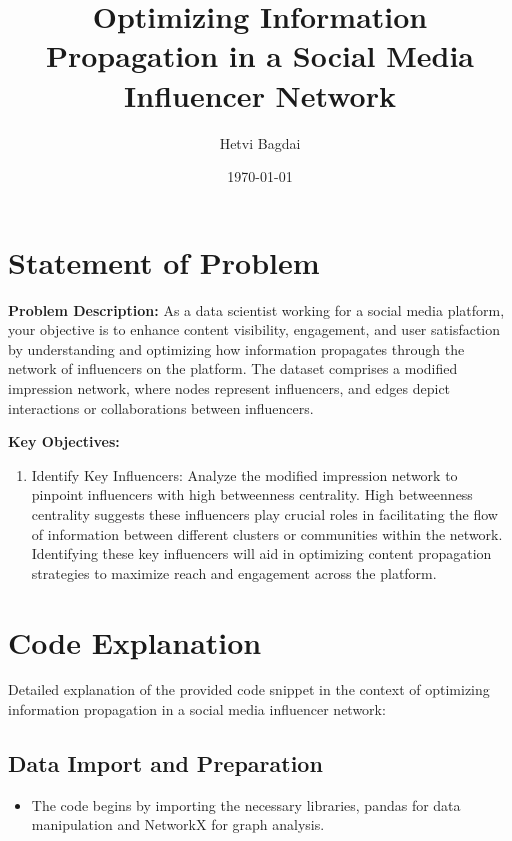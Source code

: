 \documentclass{article}
\title{Optimizing Information Propagation in a Social Media Influencer Network}
\author{Hetvi Bagdai}
\date{\today}
\begin{document}
\maketitle

\section{Statement of Problem}
\textbf{Problem Description:} As a data scientist working for a social media platform, your objective is to enhance content visibility, engagement, and user satisfaction by understanding and optimizing how information propagates through the network of influencers on the platform. The dataset comprises a modified impression network, where nodes represent influencers, and edges depict interactions or collaborations between influencers.

\textbf{Key Objectives:}
\begin{enumerate}
    \item Identify Key Influencers: Analyze the modified impression network to pinpoint influencers with high betweenness centrality. High betweenness centrality suggests these influencers play crucial roles in facilitating the flow of information between different clusters or communities within the network. Identifying these key influencers will aid in optimizing content propagation strategies to maximize reach and engagement across the platform.
\end{enumerate}

\section{Code Explanation}
Detailed explanation of the provided code snippet in the context of optimizing information propagation in a social media influencer network:

\subsection{Data Import and Preparation}
\begin{itemize}
    \item The code begins by importing the necessary libraries, pandas for data manipulation and NetworkX for graph analysis.
  
\end{itemize}
\end{document}
